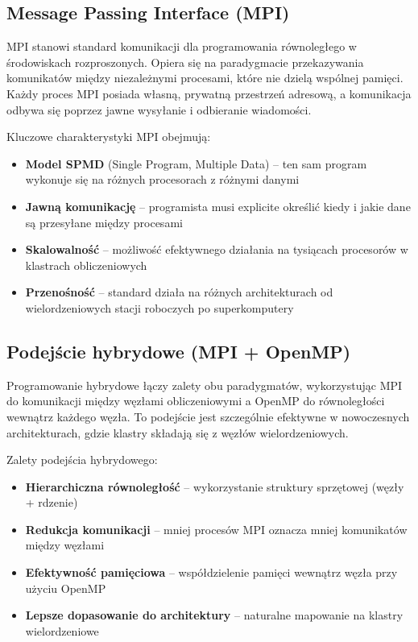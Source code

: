 \documentclass[12pt,a4paper]{report}
\begin{document}
\subsection{Message Passing Interface (MPI)}

MPI stanowi standard komunikacji dla programowania równoległego w środowiskach rozproszonych. Opiera się na paradygmacie przekazywania komunikatów między niezależnymi procesami, które nie dzielą wspólnej pamięci. Każdy proces MPI posiada własną, prywatną przestrzeń adresową, a komunikacja odbywa się poprzez jawne wysyłanie i odbieranie wiadomości.

Kluczowe charakterystyki MPI obejmują:
\begin{itemize}
    \item \textbf{Model SPMD} (Single Program, Multiple Data) -- ten sam program wykonuje się na różnych procesorach z różnymi danymi
    \item \textbf{Jawną komunikację} -- programista musi explicite określić kiedy i jakie dane są przesyłane między procesami
    \item \textbf{Skalowalność} -- możliwość efektywnego działania na tysiącach procesorów w klastrach obliczeniowych
    \item \textbf{Przenośność} -- standard działa na różnych architekturach od wielordzeniowych stacji roboczych po superkomputery
\end{itemize}

\subsection{Podejście hybrydowe (MPI + OpenMP)}

Programowanie hybrydowe łączy zalety obu paradygmatów, wykorzystując MPI do komunikacji między węzłami obliczeniowymi a OpenMP do równoległości wewnątrz każdego węzła. To podejście jest szczególnie efektywne w nowoczesnych architekturach, gdzie klastry składają się z węzłów wielordzeniowych.

Zalety podejścia hybrydowego:
\begin{itemize}
    \item \textbf{Hierarchiczna równoległość} -- wykorzystanie struktury sprzętowej (węzły + rdzenie)
    \item \textbf{Redukcja komunikacji} -- mniej procesów MPI oznacza mniej komunikatów między węzłami
    \item \textbf{Efektywność pamięciowa} -- współdzielenie pamięci wewnątrz węzła przy użyciu OpenMP
    \item \textbf{Lepsze dopasowanie do architektury} -- naturalne mapowanie na klastry wielordzeniowe
\end{itemize}
\end{document}
